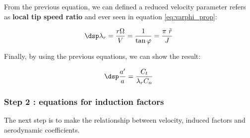 From the previous equation, we can defined a reduced velocity parameter  refers as \textbf{local tip speed ratio}
and ever seen in equation \eqref{eq:varphi_prop}:
  
\begin{equation} \dsp
  \lambda_r =  \frac{r \Omega}{V} = \frac{1}{\tan \varphi}  = \frac{\pi~\tilde r}{J}
  \label{eq:lambda_r_prop}
\end{equation}


Finally, by using the previous equations, we can show the result:

\begin{equation} \dsp
\dfrac{a'}{a} = \frac{C_t}{\lambda_r C_n}
  \label{eq:aprime_over_a}
\end{equation}



\subsubsection{\sc Step 2 : equations for induction factors}

The next step is to make the relationship between velocity, induced factors 
and aerodynamic coefficients.

